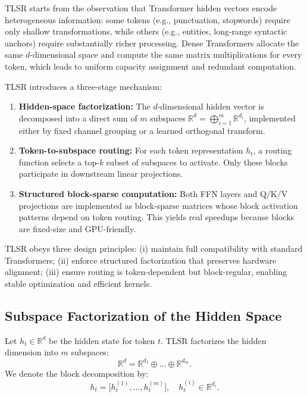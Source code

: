 \documentclass{article}
\theoremstyle{plain}
\theoremstyle{definition}
\theoremstyle{remark}
\begin{document}
TLSR starts from the observation that Transformer hidden vectors
encode heterogeneous information:
some tokens (e.g., punctuation, stopwords) require only shallow
transformations, while others (e.g., entities, long-range syntactic anchors)
require substantially richer processing.
Dense Transformers allocate the same $d$-dimensional space and compute
the same matrix multiplications for every token, which leads to
uniform capacity assignment and redundant computation.

TLSR introduces a three-stage mechanism:

\begin{enumerate}
\item \textbf{Hidden-space factorization:}
The $d$-dimensional hidden vector is decomposed into a direct sum of
$m$ subspaces $\mathbb{R}^d = \bigoplus_{i=1}^m \mathbb{R}^{d_i}$,
implemented either by fixed channel grouping or a learned orthogonal transform.
\item \textbf{Token-to-subspace routing:}
For each token representation $h_t$, a routing function
selects a top-$k$ subset of subspaces to activate.
Only these blocks participate in downstream linear projections.
\item \textbf{Structured block-sparse computation:}
Both FFN layers and Q/K/V projections are implemented as block-sparse matrices
whose block activation patterns depend on token routing.
This yields real speedups because blocks are fixed-size and GPU-friendly.
\end{enumerate}

TLSR obeys three design principles:
(i) maintain full compatibility with standard Transformers;
(ii) enforce structured factorization that preserves hardware alignment;
(iii) ensure routing is token-dependent but block-regular, enabling
stable optimization and efficient kernels.

\subsection{Subspace Factorization of the Hidden Space}

Let $h_t \in \mathbb{R}^d$ be the hidden state for token $t$.
TLSR factorizes the hidden dimension into $m$ subspaces:
\begin{equation}
\mathbb{R}^d = \mathbb{R}^{d_1} \oplus \dots \oplus \mathbb{R}^{d_m}.
\end{equation}
We denote the block decomposition by:
\begin{equation}
h_t = \big[h_t^{(1)}, \dots, h_t^{(m)}\big], 
\quad h_t^{(i)} \in \mathbb{R}^{d_i}.
\end{equation}
\end{document}
